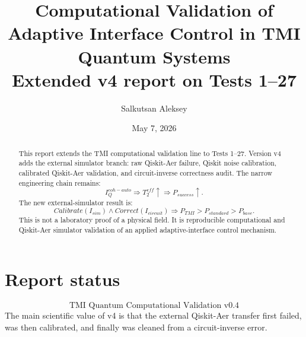 \documentclass[12pt,a4paper]{article}
\title{\textbf{Computational Validation of Adaptive Interface Control in TMI Quantum Systems}\\\large Extended v4 report on Tests 1--27}
\author{Salkutsan Aleksey}\date{May 7, 2026}
\begin{document}
\maketitle
\begin{abstract}
This report extends the TMI computational validation line to Tests 1--27. Version v4 adds the external simulator branch: raw Qiskit-Aer failure, Qiskit noise calibration, calibrated Qiskit-Aer validation, and circuit-inverse correctness audit. The narrow engineering chain remains:
\[I_Q^{coh-auto}\Rightarrow T_2^{eff}\uparrow\Rightarrow P_{success}\uparrow.\]
The new external-simulator result is:
\[Calibrate(I_{sim})\land Correct(I_{circuit})\Rightarrow P_{TMI}>P_{standard}>P_{base}.\]
This is not a laboratory proof of a physical field. It is reproducible computational and Qiskit-Aer simulator validation of an applied adaptive-interface control mechanism.
\end{abstract}\tableofcontents\newpage
\section{Report status}
\[\boxed{\text{TMI Quantum Computational Validation v0.4}}\]
The main scientific value of v4 is that the external Qiskit-Aer transfer first failed, was then calibrated, and finally was cleaned from a circuit-inverse error.
\end{document}
